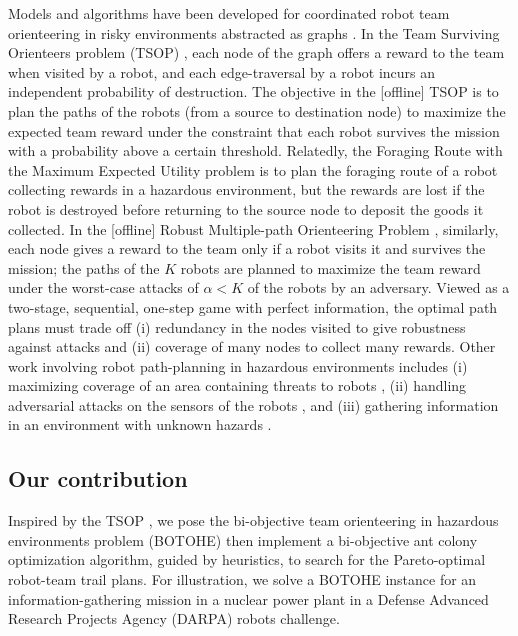 \documentclass[11pt, oneside]{article}
\begin{document}
Models and algorithms have been developed for coordinated robot team orienteering in risky environments abstracted as graphs \cite{zhou2021multi}. 
In the Team Surviving Orienteers problem (TSOP) \cite{jorgensen2018team,jorgensen2017matroid,jorgensen2024matroid}, each node of the graph offers a reward to the team when visited by a robot, and each edge-traversal by a robot incurs an independent probability of destruction. The objective in the [offline] TSOP is to plan the paths of the robots (from a source to destination node) to maximize the expected team reward under the constraint that each robot survives the mission with a probability above a certain threshold. 
Relatedly, the Foraging Route with the Maximum Expected Utility problem \cite{di2022foraging} is to plan the foraging route of a robot collecting rewards in a hazardous environment, but the rewards are lost if the robot is destroyed before returning to the source node to deposit the goods it collected.
In the [offline] Robust Multiple-path Orienteering Problem \cite{shi2023robust}, similarly, each node gives a reward to the team only if a robot visits it and survives the mission; the paths of the $K$ robots are planned to maximize the team reward under the worst-case attacks of $\alpha<K$ of the robots by an adversary. 
Viewed as a two-stage, sequential, one-step game with perfect information, the optimal path plans must trade off (i) redundancy in the nodes visited to give robustness against attacks and (ii) coverage of many nodes to collect many rewards.
Other work involving robot path-planning in hazardous environments includes 
(i) maximizing coverage of an area containing threats to robots \cite{korngut2023multi,yehoshua2016robotic}, 
(ii) handling adversarial attacks on the sensors of the robots \cite{liu2021distributed,zhou2022distributed,mayya2022adaptive,zhou2018resilient}, and 
(iii) gathering information in an environment with unknown hazards \cite{schwager2017multi}.

\subsection{Our contribution}
Inspired by the TSOP \cite{jorgensen2018team,jorgensen2017matroid,jorgensen2024matroid}, we pose the bi-objective team orienteering in hazardous environments problem (BOTOHE) then implement a bi-objective ant colony optimization algorithm, guided by heuristics, to search for the Pareto-optimal robot-team trail plans.
For illustration, we solve a BOTOHE instance for an information-gathering mission in a nuclear power plant in a Defense Advanced Research Projects Agency (DARPA) robots challenge.
\end{document}
